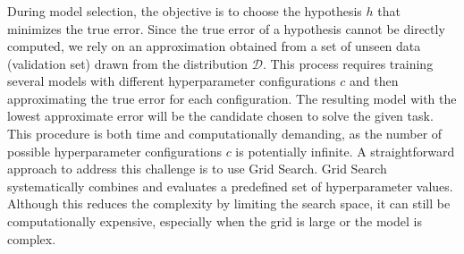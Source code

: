 \subsubsection{}
During model selection, the objective is to choose the hypothesis $h$ that minimizes the true error.
Since the true error of a hypothesis cannot be directly computed, we rely on an approximation obtained from a set of unseen data (validation set) drawn from the distribution $\mathcal{D}$. 
This process requires training several models with different hyperparameter configurations $c$ and then approximating the true error for each configuration.
The resulting model with the lowest approximate error will be the candidate chosen to solve the given task.
This procedure is both time and computationally demanding, as the number of possible hyperparameter configurations $c$ is potentially infinite.
A straightforward approach to address this challenge is to use Grid Search.
Grid Search systematically combines and evaluates a predefined set of hyperparameter values.
Although this reduces the complexity by limiting the search space, it can still be computationally expensive, especially when the grid is large or the model is complex.
